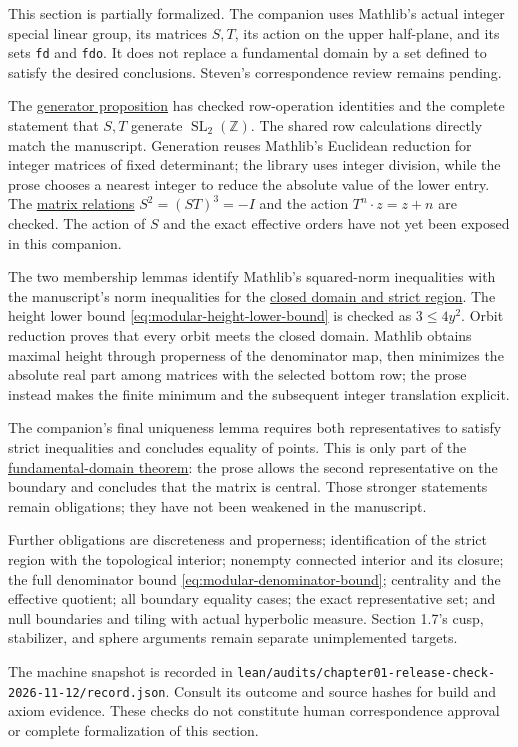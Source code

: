 This section is partially formalized. The companion uses Mathlib's actual integer special linear group, its matrices $S,T$, its action on the upper half-plane, and its sets \texttt{fd} and \texttt{fdo}. It does not replace a fundamental domain by a set defined to satisfy the desired conclusions. Steven's correspondence review remains pending.

The \hyperref[modular.generators]{generator proposition} has checked row-operation identities and the complete statement that $S,T$ generate $\operatorname{SL}_2(\mathbb Z)$. The shared row calculations directly match the manuscript. Generation reuses Mathlib's Euclidean reduction for integer matrices of fixed determinant; the library uses integer division, while the prose chooses a nearest integer to reduce the absolute value of the lower entry. The \hyperref[modular.generator-relations]{matrix relations} $S^2=(ST)^3=-I$ and the action $T^n\cdot z=z+n$ are checked. The action of $S$ and the exact effective orders have not yet been exposed in this companion.

The two membership lemmas identify Mathlib's squared-norm inequalities with the manuscript's norm inequalities for the \hyperref[modular.fundamental-region]{closed domain and strict region}. The height lower bound \eqref{eq:modular-height-lower-bound} is checked as $3\leq4y^2$. Orbit reduction proves that every orbit meets the closed domain. Mathlib obtains maximal height through properness of the denominator map, then minimizes the absolute real part among matrices with the selected bottom row; the prose instead makes the finite minimum and the subsequent integer translation explicit.

The companion's final uniqueness lemma requires both representatives to satisfy strict inequalities and concludes equality of points. This is only part of the \hyperref[modular.fundamental-domain]{fundamental-domain theorem}: the prose allows the second representative on the boundary and concludes that the matrix is central. Those stronger statements remain obligations; they have not been weakened in the manuscript.

Further obligations are discreteness and properness; identification of the strict region with the topological interior; nonempty connected interior and its closure; the full denominator bound \eqref{eq:modular-denominator-bound}; centrality and the effective quotient; all boundary equality cases; the exact representative set; and null boundaries and tiling with actual hyperbolic measure. Section 1.7's cusp, stabilizer, and sphere arguments remain separate unimplemented targets.

The machine snapshot is recorded in \texttt{lean/audits/chapter01-release-check-2026-11-12/record.json}. Consult its outcome and source hashes for build and axiom evidence. These checks do not constitute human correspondence approval or complete formalization of this section.
